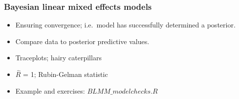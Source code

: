 \begin{frame}
	\frametitle{Bayesian linear mixed effects models}
		
		\begin{minipage}{.5\textwidth}
		\begin{itemize}
			\item Ensuring convergence; i.e.~model has successfully determined a posterior.
			\item Compare data to posterior predictive values.
			\item Traceplots; hairy caterpillars
			\item $\hat{R}$ = 1; Rubin-Gelman statistic \cite{gelman1992}
			\item Example and exercises: $BLMM\_modelchecks.R$
		\end{itemize}
		\end{minipage}
		\hfill
		\begin{minipage}{.4\textwidth}
\end{minipage}
\end{frame}
